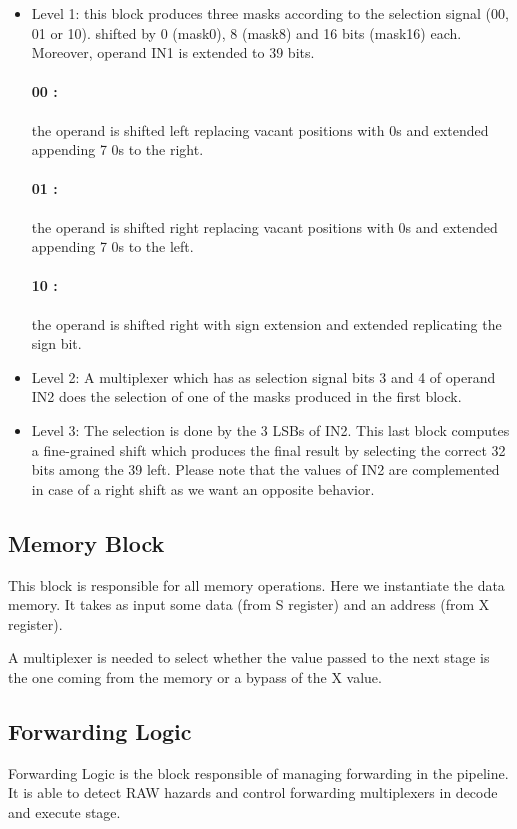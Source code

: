 \documentclass[12pt]{article}
\begin{document}
\begin{itemize}
	\item Level 1: this block produces three masks according to the selection signal (00, 01 or 10).
	shifted by 0 (mask0), 8 (mask8) and 16 bits (mask16) each. Moreover, operand IN1 is extended
	to 39 bits.
	\paragraph{00 :} the operand is shifted left replacing vacant positions with 0s and extended appending
	7 0s to the right.
	\paragraph{01 :} the operand is shifted right replacing vacant positions with 0s and extended appending
	7 0s to the left.	
	\paragraph{10 :} the operand is shifted right with sign extension and extended replicating the sign bit.
	
	\item Level 2: A multiplexer which has as selection signal bits 3 and 4 of operand IN2 does the selection of one of the masks produced in the first block.
	\item Level 3: The selection is done by the 3 LSBs of IN2. This last block computes a fine-grained shift which produces the final result by selecting the correct 32 bits among the 39 left.
	Please note that the values of IN2 are complemented in case of a right shift as we want an opposite behavior.
\end{itemize}


\subsection{Memory Block}
This block is responsible for all memory operations.
Here we instantiate the data memory. It takes as input some data (from S register) and an address (from X register).

A multiplexer is needed to select whether the value passed to the next stage is the one coming from the memory or a bypass of the X value.

\subsection{Forwarding Logic}
Forwarding Logic is the block responsible of managing forwarding in the pipeline. It is able to detect RAW hazards and control forwarding multiplexers in decode and execute stage.
\end{document}
